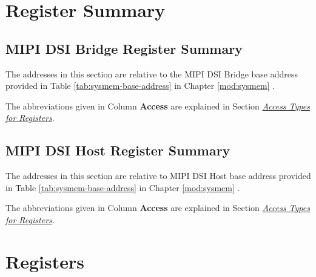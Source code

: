 \documentclass[main\_\_EN.tex]{subfiles}
\begin{document}



\newpage
\hypertarget{mipidsi-reg-summ}{}
\section{Register Summary}
\label{sec:mipidsi-reg-summ}


\subsection{MIPI DSI Bridge Register Summary}

The addresses in this section are relative to the MIPI DSI Bridge base address provided in Table \ref{tab:sysmem-base-address} in Chapter \ref{mod:sysmem} \textit{}.

The abbreviations given in Column \textbf{Access} are explained in Section \hyperref[glossary-access-types]{\textit{Access Types for Registers}}.



\subsection{MIPI DSI Host Register Summary}

The addresses in this section are relative to MIPI DSI Host base address provided in Table \ref{tab:sysmem-base-address} in Chapter \ref{mod:sysmem} \textit{}.

The abbreviations given in Column \textbf{Access} are explained in Section \hyperref[glossary-access-types]{\textit{Access Types for Registers}}.







\newpage
\section{Registers}
\end{document}
